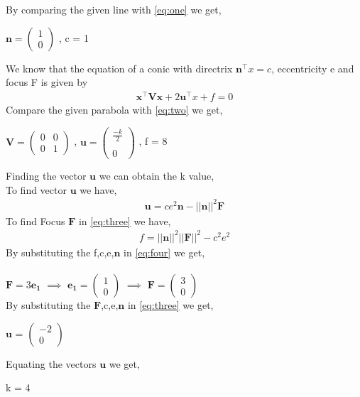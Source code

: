 \documentclass[journal,12pt,twocolumn]{IEEEtran}
\newcommand{\myvec}[1]{\ensuremath{\begin{pmatrix}#1\end{pmatrix}}}
\let\vec\mathbf
\begin{document}
By comparing the given line with \eqref{eq:one} we get, 
\begin{center}
$\vec{n} = \myvec{1\\0}$ , c = 1 
\end{center}
We know that the equation of a conic with directrix $\vec{n}^\top x = c$, eccentricity e and focus F is given by 
\begin{align}
\label{eq:two}
\vec{x^\top Vx}+2\vec{u^\top}x+f = 0 
\end{align}
Compare the given parabola with \eqref{eq:two} we get,
\begin{center}
$\vec{V} = \myvec{0&0\\0&1}$ , $\vec{u} = \myvec{\frac{-k}{2} \\ \\ 0}$ , f = 8
\end{center}
Finding the vector $\vec{u}$ we can obtain the k value,\\ 
To find vector $\vec{u}$ we have,
\begin{align}
\label{eq:three}
\vec{u}=ce^2\vec{n}-||\vec{n}||^2\vec{F}
\end{align}
To find Focus $\vec{F}$ in \eqref{eq:three} we have,
\begin{align}
\label{eq:four}
f = ||\vec{n}||^2||\vec{F}||^2-c^2e^2
\end{align}
By substituting the f,c,e,$\vec{n}$ in \eqref{eq:four} we get,\\
\\$\vec{F} = 3\vec{e_1}$ $\implies$ $\vec{e_1} = \myvec{1 \\ 0}$ $\implies$ $\vec{F} = \myvec{3 \\ 0}$\\
By substituting the $\vec{F}$,c,e,$\vec{n}$ in \eqref{eq:three} we get,
\begin{center}
$\vec{u}$ = $\myvec{-2 \\ 0}$
\end{center}
Equating the vectors $\vec{u}$ we get,
\begin{center}
k = 4
\end{center}
\end{document}
